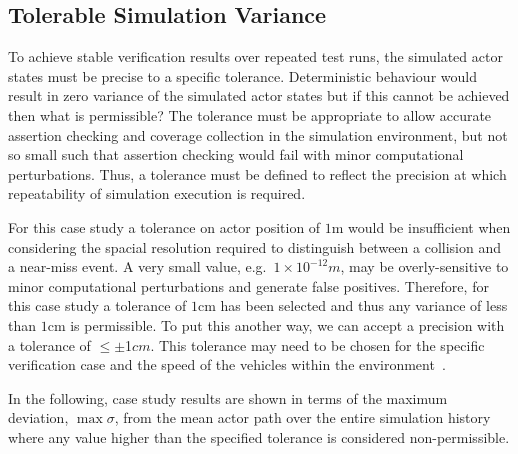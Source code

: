 \subsection{Tolerable Simulation Variance}\label{s:tolerance}
To achieve stable verification results over repeated test runs, the simulated actor states must be precise to a specific tolerance. Deterministic behaviour would result in zero variance of the simulated actor states but if this cannot be achieved then what is permissible? The tolerance must be appropriate to allow accurate assertion checking and coverage collection in the simulation environment, but not so small such that assertion checking would fail with minor computational perturbations. Thus, a tolerance must be defined to reflect the precision at which repeatability of simulation execution is required. 

For this case study a tolerance on actor position of $1$m would be insufficient when considering the spacial resolution required to distinguish between a collision and a near-miss event. A very small value, e.g.\ $1\times10^{-12}m$, may be overly-sensitive to minor computational perturbations and generate false positives. Therefore, for this case study a tolerance of $1$cm has been selected and thus any variance of less than $1$cm is permissible. To put this another way, we can accept a precision with a tolerance of $\leq$$\pm$1$cm$. This tolerance may need to be chosen for the specific verification case and the speed of the vehicles within the environment~\cite{jiang2014intercultural}.

In the following, case study results are shown in terms of the maximum deviation, $\max\sigma$, from the mean actor path over the entire simulation history where any value higher than the specified tolerance is considered non-permissible.



